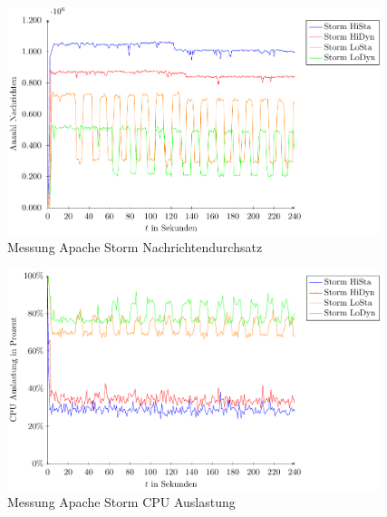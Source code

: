 \begin{figure}
\includegraphics[width=0.97\textwidth]{plots/messungStormDurchsatz.pdf}
\caption{Messung Apache Storm Nachrichtendurchsatz
\label{fig:messungStormDurchsatz}}
\end{figure}
\begin{figure}
\includegraphics[width=0.97\textwidth]{plots/messungStormCpu.pdf}
\caption{Messung Apache Storm CPU Auslastung
\label{fig:messungStormCpu}}
\end{figure}


